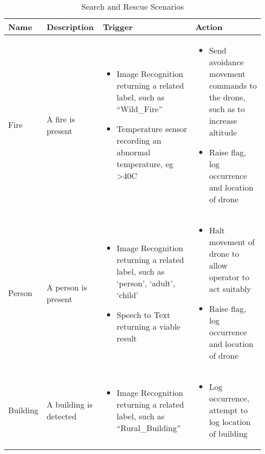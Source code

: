 \documentclass{article}
\begin{document}
\begin{table}[ht]
\caption{Search and Rescue Scenarios}
\hyphenchar{}
\centering
\begin{tabularx}{\textwidth}{| >{\centering}m{1.5cm} | >{\centering}m{2cm} | X | X |}
    \hline
    Name & Description & Trigger & Action \\ \hline
    Fire & \vspace{\baselineskip} A fire is present &
    \begin{itemize}[topsep=0pt, leftmargin=0cm,itemindent=.5cm,labelwidth=\itemindent,labelsep=0cm,align=left]
        \item Image Recognition returning a related label, such as “Wild\_Fire”
        \item Temperature sensor recording an abnormal temperature, eg >40C
    \end{itemize} &
    \begin{itemize} [topsep=0pt, leftmargin=0cm,itemindent=.5cm,labelwidth=\itemindent,labelsep=0cm,align=left]
        \item Send avoidance movement commands to the drone, such as to increase altitude
        \item Raise flag, log occurrence and location of drone
    \end{itemize} \\ \hline

    Person & \vspace{\baselineskip} A person is present &
    \begin{itemize} [topsep=0pt, leftmargin=0cm,itemindent=.5cm,labelwidth=\itemindent,labelsep=0cm,align=left]
        \item Image Recognition returning a related label, such as `person', `adult', `child'
        \item Speech to Text returning a viable result
    \end{itemize} &
    \begin{itemize} [topsep=0pt, leftmargin=0cm,itemindent=.5cm,labelwidth=\itemindent,labelsep=0cm,align=left]
        \item Halt movement of drone to allow operator to act suitably
        \item Raise flag, log occurrence and location of drone
    \end{itemize} \\ \hline

    Building & \vspace{\baselineskip} A building is detected &
    \begin{itemize} [topsep=0pt, leftmargin=0cm,itemindent=.5cm,labelwidth=\itemindent,labelsep=0cm,align=left]
        \item Image Recognition returning a related label, such as “Rural\_Building”
    \end{itemize} &
    \begin{itemize} [topsep=0pt, leftmargin=0cm,itemindent=.5cm,labelwidth=\itemindent,labelsep=0cm,align=left]
        \item Log occurrence, attempt to log location of building
    \end{itemize} \\ \hline


\end{tabularx}
\end{table}
\end{document}

